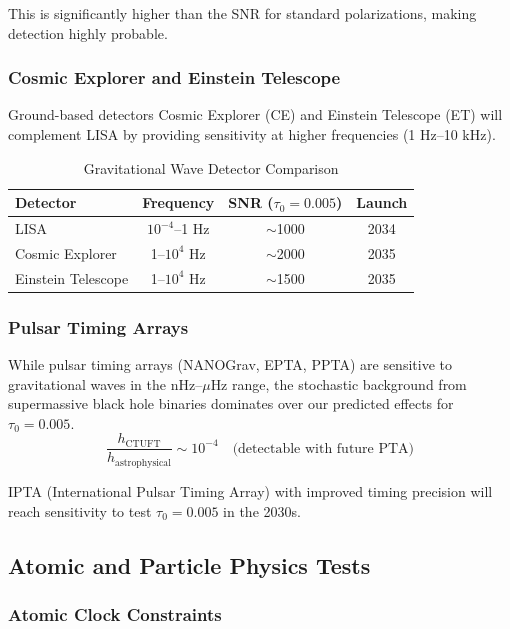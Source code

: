 This is significantly higher than the SNR for standard polarizations, making detection highly probable.

\subsubsection{Cosmic Explorer and Einstein Telescope}

Ground-based detectors Cosmic Explorer (CE) and Einstein Telescope (ET) will complement LISA by providing sensitivity at higher frequencies (1 Hz--10 kHz).

\begin{table}[htbp]
\centering
\caption{Gravitational Wave Detector Comparison}
\label{tab:gw_detectors}
\begin{tabular}{lccc}
\hline
\textbf{Detector} & \textbf{Frequency} & \textbf{SNR ($\tau_0=0.005$)} & \textbf{Launch} \\
\hline
LISA & $10^{-4}$--1 Hz & $\sim$1000 & 2034 \\
Cosmic Explorer & 1--$10^4$ Hz & $\sim$2000 & 2035 \\
Einstein Telescope & 1--$10^4$ Hz & $\sim$1500 & 2035 \\
\hline
\end{tabular}
\end{table}

\subsubsection{Pulsar Timing Arrays}

While pulsar timing arrays (NANOGrav, EPTA, PPTA) are sensitive to gravitational waves in the nHz--$\mu$Hz range, the stochastic background from supermassive black hole binaries dominates over our predicted effects for $\tau_0 = 0.005$.
\begin{equation}
    \frac{h_{\text{CTUFT}}}{h_{\text{astrophysical}}} \sim 10^{-4} \quad \text{(detectable with future PTA)}
\end{equation}

IPTA (International Pulsar Timing Array) with improved timing precision will reach sensitivity to test $\tau_0 = 0.005$ in the 2030s.

\subsection{Atomic and Particle Physics Tests}

\subsubsection{Atomic Clock Constraints}


